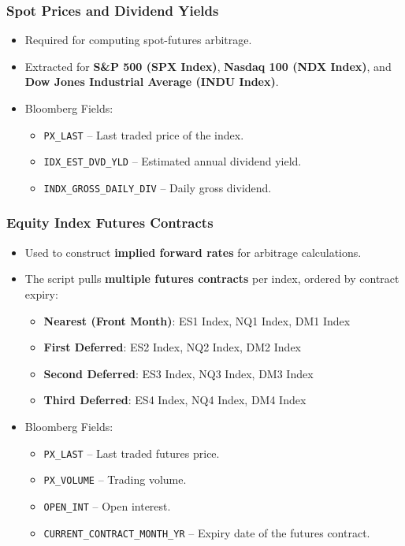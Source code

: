 \documentclass{article}
\begin{document}
\subsubsection{Spot Prices and Dividend Yields}
\begin{itemize}
  \item Required for computing spot-futures arbitrage.
  \item Extracted for \textbf{S\&P 500 (SPX Index)}, \textbf{Nasdaq 100 (NDX Index)}, and \textbf{Dow Jones Industrial Average (INDU Index)}.
  \item Bloomberg Fields:
  \begin{itemize}
    \item \texttt{PX\_LAST} -- Last traded price of the index.
    \item \texttt{IDX\_EST\_DVD\_YLD} -- Estimated annual dividend yield.
    \item \texttt{INDX\_GROSS\_DAILY\_DIV} -- Daily gross dividend.
  \end{itemize}
\end{itemize}

\subsubsection{Equity Index Futures Contracts}
\begin{itemize}
  \item Used to construct \textbf{implied forward rates} for arbitrage calculations.
  \item The script pulls \textbf{multiple futures contracts} per index, ordered by contract expiry:
  \begin{itemize}
    \item \textbf{Nearest (Front Month)}: ES1 Index, NQ1 Index, DM1 Index
    \item \textbf{First Deferred}: ES2 Index, NQ2 Index, DM2 Index
    \item \textbf{Second Deferred}: ES3 Index, NQ3 Index, DM3 Index
    \item \textbf{Third Deferred}: ES4 Index, NQ4 Index, DM4 Index
  \end{itemize}
  \item Bloomberg Fields:
  \begin{itemize}
    \item \texttt{PX\_LAST} -- Last traded futures price.
    \item \texttt{PX\_VOLUME} -- Trading volume.
    \item \texttt{OPEN\_INT} -- Open interest.
    \item \texttt{CURRENT\_CONTRACT\_MONTH\_YR} -- Expiry date of the futures contract.
  \end{itemize}
\end{itemize}
\end{document}
